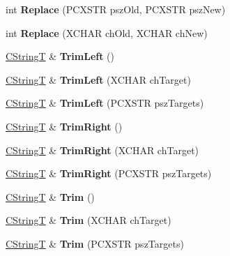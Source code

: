 \begin{DoxyCompactItemize}
int {\bfseries Replace} (P\+C\+X\+S\+TR psz\+Old, P\+C\+X\+S\+TR psz\+New)
\item 
\mbox{\label{class_a_t_l_1_1_c_string_t_a00f2b215287e040768bd81d481d93914}} 
int {\bfseries Replace} (X\+C\+H\+AR ch\+Old, X\+C\+H\+AR ch\+New)
\item 
\mbox{\label{class_a_t_l_1_1_c_string_t_a121420bd7a242855d2e2a3b190c62573}} 
\hyperlink{class_a_t_l_1_1_c_string_t}{C\+StringT} \& {\bfseries Trim\+Left} ()
\item 
\mbox{\label{class_a_t_l_1_1_c_string_t_aeb253cfc17fb7a381e3cf8cf64c6c831}} 
\hyperlink{class_a_t_l_1_1_c_string_t}{C\+StringT} \& {\bfseries Trim\+Left} (X\+C\+H\+AR ch\+Target)
\item 
\mbox{\label{class_a_t_l_1_1_c_string_t_ad0f0f38b4be1315b7e228d5327f4b213}} 
\hyperlink{class_a_t_l_1_1_c_string_t}{C\+StringT} \& {\bfseries Trim\+Left} (P\+C\+X\+S\+TR psz\+Targets)
\item 
\mbox{\label{class_a_t_l_1_1_c_string_t_aedd3a5ae4d4ffd00d70c39495d4b0e05}} 
\hyperlink{class_a_t_l_1_1_c_string_t}{C\+StringT} \& {\bfseries Trim\+Right} ()
\item 
\mbox{\label{class_a_t_l_1_1_c_string_t_a83fe80b000d4bed55bc8c536ddf358af}} 
\hyperlink{class_a_t_l_1_1_c_string_t}{C\+StringT} \& {\bfseries Trim\+Right} (X\+C\+H\+AR ch\+Target)
\item 
\mbox{\label{class_a_t_l_1_1_c_string_t_aaef3456ae921e42ad13a299cd4cbf008}} 
\hyperlink{class_a_t_l_1_1_c_string_t}{C\+StringT} \& {\bfseries Trim\+Right} (P\+C\+X\+S\+TR psz\+Targets)
\item 
\mbox{\label{class_a_t_l_1_1_c_string_t_a0f1b5121971759666f3b3917099349bb}} 
\hyperlink{class_a_t_l_1_1_c_string_t}{C\+StringT} \& {\bfseries Trim} ()
\item 
\mbox{\label{class_a_t_l_1_1_c_string_t_af2090996cd54320f0d407e0dc614c0be}} 
\hyperlink{class_a_t_l_1_1_c_string_t}{C\+StringT} \& {\bfseries Trim} (X\+C\+H\+AR ch\+Target)
\item 
\mbox{\label{class_a_t_l_1_1_c_string_t_a8533da6936712e4312a205af96be9061}} 
\hyperlink{class_a_t_l_1_1_c_string_t}{C\+StringT} \& {\bfseries Trim} (P\+C\+X\+S\+TR psz\+Targets)
\end{DoxyCompactItemize}
